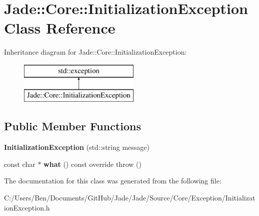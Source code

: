 \hypertarget{class_jade_1_1_core_1_1_initialization_exception}{}\section{Jade\+:\+:Core\+:\+:Initialization\+Exception Class Reference}
\label{class_jade_1_1_core_1_1_initialization_exception}
Inheritance diagram for Jade\+:\+:Core\+:\+:Initialization\+Exception\+:\begin{figure}[H]
\begin{center}
\leavevmode
\includegraphics[height=2.000000cm]{class_jade_1_1_core_1_1_initialization_exception}
\end{center}
\end{figure}
\subsection*{Public Member Functions}
\begin{DoxyCompactItemize}
\item 
\hypertarget{class_jade_1_1_core_1_1_initialization_exception_ac5f8c44049f3c21b91cf7fd101dd0832}{}{\bfseries Initialization\+Exception} (std\+::string message)\label{class_jade_1_1_core_1_1_initialization_exception_ac5f8c44049f3c21b91cf7fd101dd0832}

\item 
\hypertarget{class_jade_1_1_core_1_1_initialization_exception_a7ed1653564bf8c76baad021bd1929ccc}{}const char $\ast$ {\bfseries what} () const  override  throw ()\label{class_jade_1_1_core_1_1_initialization_exception_a7ed1653564bf8c76baad021bd1929ccc}

\end{DoxyCompactItemize}


The documentation for this class was generated from the following file\+:\begin{DoxyCompactItemize}
\item 
C\+:/\+Users/\+Ben/\+Documents/\+Git\+Hub/\+Jade/\+Jade/\+Source/\+Core/\+Exception/Initialization\+Exception.\+h\end{DoxyCompactItemize}
